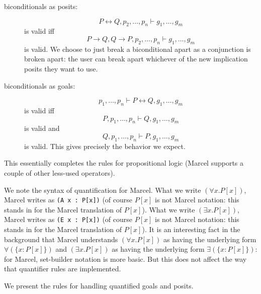 \documentclass[12pt]{book}
\begin{document}
\begin{description}
\item[biconditionals as posits:]  $$P \leftrightarrow Q,p_2,\ldots,p_n \vdash g_1,\ldots,g_m$$ is valid iff $$P \rightarrow Q,Q\rightarrow P,p_2,\ldots,p_n \vdash g_1,\ldots,g_m$$ is valid.  We choose to just break a biconditional apart as a conjunction is broken apart:  the user can break apart whichever of the new implication posits they want to use.

\item[biconditionals as goals:]  $$p_1,\ldots,p_n\vdash P \leftrightarrow Q,g_1,\ldots,g_m$$ is valid iff $$P,p_1,\ldots,p_n\vdash Q,g_1,\ldots,g_m$$ is valid and $$Q,p_1,\ldots,p_n\vdash P,g_1,\ldots,g_m$$ is valid.  This gives precisely the behavior we expect.


\end{description}

This essentially completes the rules for propositional logic (Marcel supports a couple of other less-used operators).

We note the syntax of quantification for Marcel.  What we write $(\forall x.P[x])$, Marcel writes as {\tt (A x : P[x])} (of course $P[x]$ is not Marcel notation:  this stands in for the Marcel translation of $P[x]$).  What we write $(\exists x.P[x])$, Marcel writes as {\tt (E x : P[x])} (of course $P[x]$ is not Marcel notation:  this stands in for the Marcel translation of $P[x]$).   It is an interesting fact in the background that Marcel understands $(\forall x.P[x])$ as having the underlying form $\forall(\{x:P[x]\})$ and $(\exists x.P[x])$ as having the underlying form $\exists(\{x:P[x]\})$:  for Marcel, set-builder notation is more basic.  But this does not affect the way that quantifier rules are implemented.

We present the rules for handling quantified goals and posits.
\end{document}
